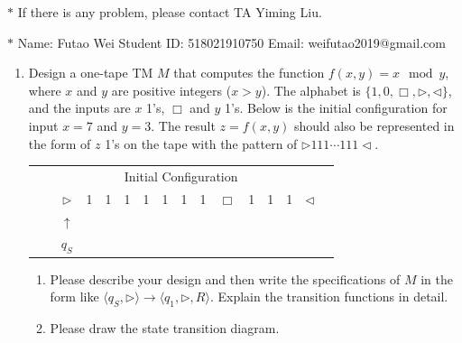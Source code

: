 \documentclass[12pt,a4paper]{article}
\theoremstyle{definition}
\begin{document}
\noindent

\noindent{}
\begin{center}
\footnotesize{\color{red}$*$ If there is any problem, please contact TA Yiming Liu. }

\footnotesize{\color{blue}$*$ Name: Futao Wei  \quad Student ID: 518021910750 \quad Email: weifutao2019@gmail.com}
\end{center}

\begin{enumerate}

\item
Design a one-tape TM $M$ that computes the function $f(x, y) = x \mod y$, where $x$ and $y$ are positive integers ($x > y$). The alphabet is $\{1, 0, \Box, \triangleright, \triangleleft\}$, and the inputs are $x$ 1's, $\Box$ and $y$ 1's. Below is the initial configuration for input $x=7$ and $y=3$. The result $z=f(x, y)$ should also be represented in the form of $z$ 1's on the tape with the pattern of $\triangleright 111 \cdots 111 \triangleleft$.
\begin{center}
	\begin{tabular}{ll|c|c|c|c|c|c|c|c|c|c|c|c|c|c}
		& \multicolumn{14}{c}{Initial Configuration}\\[5pt]
		\cline{2-16}
		& & $\triangleright$ &  1  & 1 & 1 & 1 & 1 & 1 & 1 & $\Box$ & 1 & 1 & 1 & $ \triangleleft$ & \\
		\cline{2-16}
		\multicolumn{2}{c}{} & \multicolumn{1}{c}{$\uparrow$} & \multicolumn{11}{c}{}\\[-4pt]
		\multicolumn{2}{c}{} & \multicolumn{1}{c}{$q_S$} & \multicolumn{11}{c}{}	
	\end{tabular}
\end{center}

\begin{enumerate}
	\item
	Please describe your design and then write the specifications of $M$ in the form like $\langle q_S, \triangleright \rangle \rightarrow \langle q_1, \triangleright,  R\rangle$. Explain the transition functions in detail.
	
	\item
	Please draw the state transition diagram.
	

\end{enumerate}
\end{enumerate}
\end{document}
